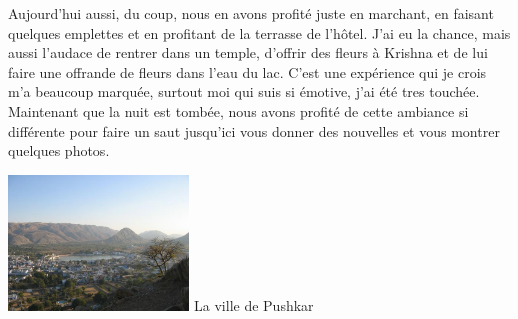 \begin{multicols}{2}
Aujourd'hui aussi, du coup, nous en avons profité juste en marchant, en faisant quelques emplettes et en profitant de la terrasse de l'hôtel. J'ai eu la chance, mais aussi l'audace de rentrer dans un temple, d'offrir des fleurs à Krishna et de lui faire une offrande de fleurs dans l'eau du lac. C'est une expérience qui je crois m'a beaucoup marquée, surtout moi qui suis si émotive, j'ai été tres touchée.  Maintenant que la nuit est tombée, nous avons profité de cette ambiance si différente pour faire un saut jusqu'ici vous donner des nouvelles et vous montrer quelques photos.

\hspace*{-0.65cm}
\includegraphics[width=4.8cm]{articles/Journees-zen/pushkar.jpg}
La ville de Pushkar

\end{multicols}


